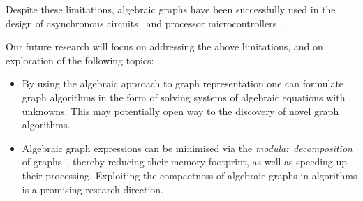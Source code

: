 Despite these limitations, algebraic graphs have been successfully used
in the design of asynchronous circuits~\cite{2015_beaumont_concepts} and
processor microcontrollers~\cite{2014_algebra_mokhov}.

Our future research will focus on addressing the above limitations, and on
exploration of the following topics:

\begin{itemize}
    \item By using the algebraic approach to graph representation one can
    formulate graph algorithms in the form of solving systems of algebraic
    equations with unknowns.
    This may potentially open way to the discovery of novel graph algorithms.
    \item Algebraic graph expressions can be minimised via the
    \emph{modular decomposition} of graphs~\cite{2005_mcconnell_modular}, thereby
    reducing their memory footprint, as well as speeding up their processing.
    Exploiting the compactness of algebraic graphs in algorithms is a
    promising research direction.
\end{itemize}
